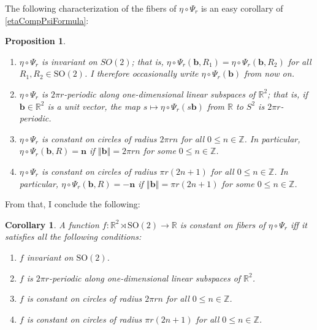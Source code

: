 \documentclass[a4paper,11pt]{scrartcl}
\newcounter{dummy}
\numberwithin{dummy}{section}
\theoremstyle{plain}
\newtheorem{proposition}[dummy]{Proposition}
\theoremstyle{plain}
\theoremstyle{plain}
\theoremstyle{plain}
\newtheorem{corollary}[dummy]{Corollary}
\theoremstyle{nonumberplain}
\newcommand{\F}[1][R]{\mathbb{#1}} %
\newcommand{\Ltwonorm}[1]{\left\Vert #1 \right\Vert} %
\newcommand{\SO}{\mathrm{SO}}
\begin{document}
	The following characterization of the fibers of $ \eta \circ \Psi_{r} $ is an easy corollary of \cref{etaCompPsiFormula}:
	\begin{proposition}
		\label{etaCompPsiFibers}
		\begin{enumerate}[label=(\roman*), ref=(\roman*)]
			\item $ \eta \circ \Psi_{r} $ is invariant on $ SO(2) $; that is, $ \eta \circ \Psi_{r} (\mathbf{b}, R_{1}) = \eta \circ \Psi_{r} (\mathbf{b}, R_{2}) $ for all $ R_{1}, R_{2} \in \SO(2) $. I therefore occasionally write $ \eta \circ \Psi_{r} (\mathbf{b}) $ from now on.
			
			\item \label{etaCompPsiFibersRadiallyPeriodic} $ \eta \circ \Psi_{r} $ is $ 2 \pi r $-periodic along one-dimensional linear subspaces of $ \F^{2} $; that is, if $ \mathbf{b} \in \F^{2} $ is a unit vector, the map $ s \mapsto \eta \circ \Psi_{r} (s \mathbf{b}) $ from $ \F $ to $ S^{2} $ is $ 2 \pi r $-periodic.
			
			\item $ \eta \circ \Psi_{r} $ is constant on circles of radius $ 2 \pi r n $ for all $ 0 \le n \in \F[Z] $. In particular, $ \eta \circ \Psi_{r} (\mathbf{b}, R) = \mathbf{n} $ if $ \Ltwonorm{\mathbf{b}} = 2 \pi r n $ for some $ 0 \le n \in \F[Z] $.
			
			\item $ \eta \circ \Psi_{r} $ is constant on circles of radius $ \pi r (2n+1) $ for all $ 0 \le n \in \F[Z] $. In particular, $ \eta \circ \Psi_{r} (\mathbf{b}, R) = -\mathbf{n} $ if $ \Ltwonorm{\mathbf{b}} = \pi r (2n+1) $ for some $ 0 \le n \in \F[Z] $.
			
		\end{enumerate}
	\end{proposition}
	
	From that, I conclude the following:
	\begin{corollary}
		\label{ConstOnFiber}
		A function $ f : \F^{2} \rtimes \SO(2) \to \F $ is constant on fibers of $ \eta \circ \Psi_{r} $ iff it satisfies all the following conditions:
		\begin{enumerate}
			\item $ f $ invariant on $ \SO(2) $.
			
			\item $ f $ is $ 2 \pi r $-periodic along one-dimensional linear subspaces of $ \F^{2} $.
			
			\item $ f $ is constant on circles of radius $ 2 \pi r n $ for all $ 0 \le n \in \F[Z] $.
			
			\item $ f $ is constant on circles of radius $ \pi r (2n+1) $ for all $ 0 \le n \in \F[Z] $.
			
		\end{enumerate}
	\end{corollary}
	
\end{document}
